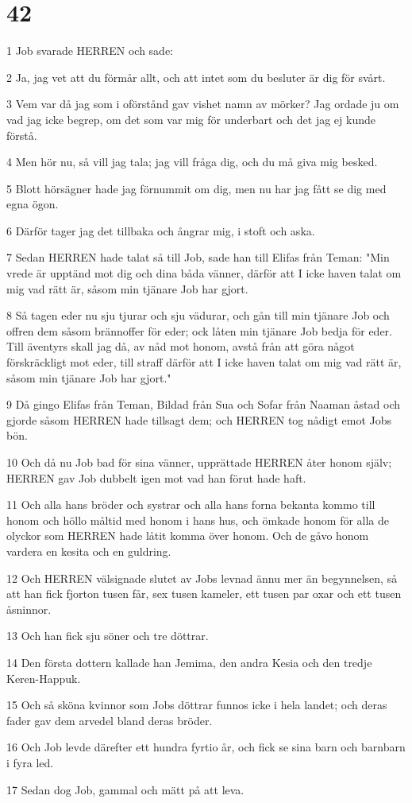 \chapter{42}

\par 1 Job svarade HERREN och sade:
\par 2 Ja, jag vet att du förmår allt, och att intet som du besluter är dig för svårt.
\par 3 Vem var då jag som i oförstånd gav vishet namn av mörker? Jag ordade ju om vad jag icke begrep, om det som var mig för underbart och det jag ej kunde förstå.
\par 4 Men hör nu, så vill jag tala; jag vill fråga dig, och du må giva mig besked.
\par 5 Blott hörsägner hade jag förnummit om dig, men nu har jag fått se dig med egna ögon.
\par 6 Därför tager jag det tillbaka och ångrar mig, i stoft och aska.
\par 7 Sedan HERREN hade talat så till Job, sade han till Elifas från Teman: "Min vrede är upptänd mot dig och dina båda vänner, därför att I icke haven talat om mig vad rätt är, såsom min tjänare Job har gjort.
\par 8 Så tagen eder nu sju tjurar och sju vädurar, och gån till min tjänare Job och offren dem såsom brännoffer för eder; ock låten min tjänare Job bedja för eder. Till äventyrs skall jag då, av nåd mot honom, avstå från att göra något förskräckligt mot eder, till straff därför att I icke haven talat om mig vad rätt är, såsom min tjänare Job har gjort."
\par 9 Då gingo Elifas från Teman, Bildad från Sua och Sofar från Naaman åstad och gjorde såsom HERREN hade tillsagt dem; och HERREN tog nådigt emot Jobs bön.
\par 10 Och då nu Job bad för sina vänner, upprättade HERREN åter honom själv; HERREN gav Job dubbelt igen mot vad han förut hade haft.
\par 11 Och alla hans bröder och systrar och alla hans forna bekanta kommo till honom och höllo måltid med honom i hans hus, och ömkade honom för alla de olyckor som HERREN hade låtit komma över honom. Och de gåvo honom vardera en kesita och en guldring.
\par 12 Och HERREN välsignade slutet av Jobs levnad ännu mer än begynnelsen, så att han fick fjorton tusen får, sex tusen kameler, ett tusen par oxar och ett tusen åsninnor.
\par 13 Och han fick sju söner och tre döttrar.
\par 14 Den första dottern kallade han Jemima, den andra Kesia och den tredje Keren-Happuk.
\par 15 Och så sköna kvinnor som Jobs döttrar funnos icke i hela landet; och deras fader gav dem arvedel bland deras bröder.
\par 16 Och Job levde därefter ett hundra fyrtio år, och fick se sina barn och barnbarn i fyra led.
\par 17 Sedan dog Job, gammal och mätt på att leva.


